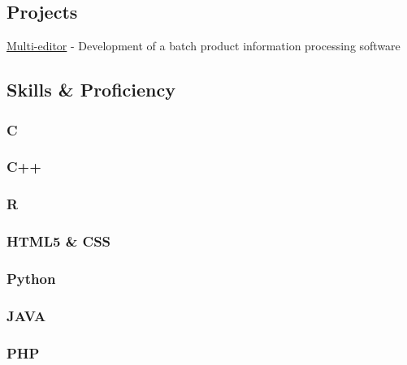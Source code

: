 \documentclass[
  english,
]{article}
\begin{document}
\hypertarget{projects}{%
\subsection{\texorpdfstring{{ \emph{} \emph{} }
Projects}{    Projects}}\label{projects}}

{ \protect\hyperlink{}{Multi-editor} } - {Development of a batch product
information processing software}

\hypertarget{skills-proficiency}{%
\subsection{\texorpdfstring{{ \emph{} \emph{} } Skills \&
Proficiency}{    Skills \& Proficiency}}\label{skills-proficiency}}

\hypertarget{c}{%
\subsubsection{C}\label{c}}

\hypertarget{c-1}{%
\subsubsection{C++}\label{c-1}}

\hypertarget{r}{%
\subsubsection{R}\label{r}}

\hypertarget{html5-css}{%
\subsubsection{HTML5 \& CSS}\label{html5-css}}

\hypertarget{python}{%
\subsubsection{Python}\label{python}}

\hypertarget{java}{%
\subsubsection{JAVA}\label{java}}

\hypertarget{php}{%
\subsubsection{PHP}\label{php}}
\end{document}
